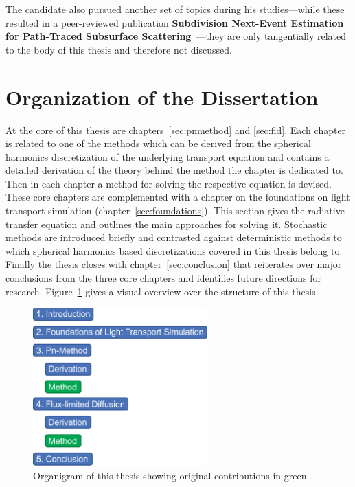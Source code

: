 The candidate also pursued another set of topics during his studies---while these resulted in a peer-reviewed publication \textbf{Subdivision Next-Event Estimation for Path-Traced Subsurface Scattering}~\cite{Koerner16}---they are only tangentially related to the body of this thesis and therefore not discussed.

\section{Organization of the Dissertation}

At the core of this thesis are chapters~\ref{sec:pnmethod} and \ref{sec:fld}. Each chapter is related to one of the methods which can be derived from the spherical harmonics discretization of the underlying transport equation and contains a detailed derivation of the theory behind the method the chapter is dedicated to. Then in each chapter a method for solving the respective equation is devised. These core chapters are complemented with a chapter on the foundations on light transport simulation (chapter~\ref{sec:foundations}). This section gives the radiative transfer equation and outlines the main approaches for solving it. Stochastic methods are introduced briefly and contrasted against deterministic methods to which spherical harmonics based discretizations covered in this thesis belong to. Finally the thesis closes with chapter~\ref{sec:conclusion} that reiterates over major conclusions from the three core chapters and identifies future directions for research. Figure~\ref{fig:intro_organization} gives a visual overview over the structure of this thesis.
\begin{figure}[ht]
\hspace{0.1\columnwidth}
\includegraphics[width=0.6\textwidth]{02_Introduction/figures/fig_organigram.pdf}
\caption{Organigram of this thesis showing original contributions in green.}
\label{fig:intro_organization}
\end{figure}








